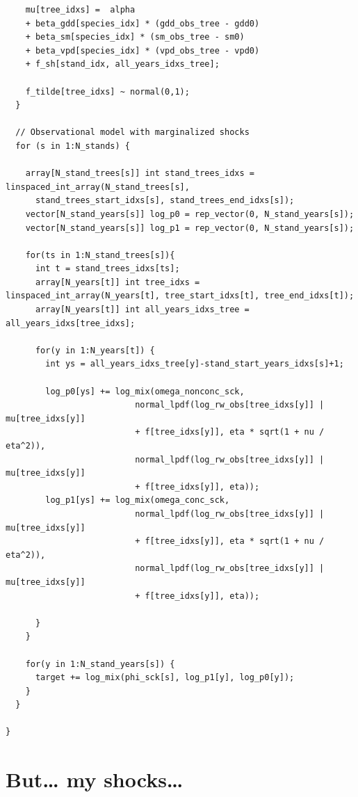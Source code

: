 \documentclass[
  letterpaper,
  DIV=11,
  numbers=noendperiod]{scrartcl}
\begin{document}
\begin{verbatim}
    mu[tree_idxs] =  alpha
    + beta_gdd[species_idx] * (gdd_obs_tree - gdd0)
    + beta_sm[species_idx] * (sm_obs_tree - sm0)
    + beta_vpd[species_idx] * (vpd_obs_tree - vpd0)
    + f_sh[stand_idx, all_years_idxs_tree];
    
    f_tilde[tree_idxs] ~ normal(0,1);
  }
  
  // Observational model with marginalized shocks
  for (s in 1:N_stands) {
    
    array[N_stand_trees[s]] int stand_trees_idxs = linspaced_int_array(N_stand_trees[s], 
      stand_trees_start_idxs[s], stand_trees_end_idxs[s]);
    vector[N_stand_years[s]] log_p0 = rep_vector(0, N_stand_years[s]);
    vector[N_stand_years[s]] log_p1 = rep_vector(0, N_stand_years[s]);
    
    for(ts in 1:N_stand_trees[s]){
      int t = stand_trees_idxs[ts];
      array[N_years[t]] int tree_idxs = linspaced_int_array(N_years[t], tree_start_idxs[t], tree_end_idxs[t]);
      array[N_years[t]] int all_years_idxs_tree = all_years_idxs[tree_idxs];
      
      for(y in 1:N_years[t]) {
        int ys = all_years_idxs_tree[y]-stand_start_years_idxs[s]+1;
        
        log_p0[ys] += log_mix(omega_nonconc_sck,
                          normal_lpdf(log_rw_obs[tree_idxs[y]] | mu[tree_idxs[y]] 
                          + f[tree_idxs[y]], eta * sqrt(1 + nu / eta^2)),
                          normal_lpdf(log_rw_obs[tree_idxs[y]] | mu[tree_idxs[y]] 
                          + f[tree_idxs[y]], eta));
        log_p1[ys] += log_mix(omega_conc_sck,
                          normal_lpdf(log_rw_obs[tree_idxs[y]] | mu[tree_idxs[y]] 
                          + f[tree_idxs[y]], eta * sqrt(1 + nu / eta^2)),
                          normal_lpdf(log_rw_obs[tree_idxs[y]] | mu[tree_idxs[y]] 
                          + f[tree_idxs[y]], eta));
        
      }
    }
    
    for(y in 1:N_stand_years[s]) {
      target += log_mix(phi_sck[s], log_p1[y], log_p0[y]);
    }
  }
  
}
\end{verbatim}

\linespread{2}

\section{But\ldots{} my shocks\ldots{}}\label{but-my-shocks}
\end{document}
